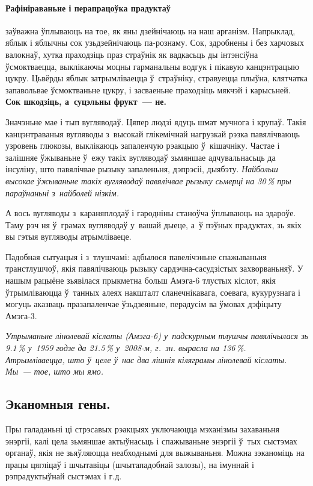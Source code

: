 \paragraph{Рафініраваньне і перапрацоўка прадуктаў} заўважна ўплываюць на тое, як яны дзейнічаюць на наш арганізм. Напрыклад, яблык і яблычны сок узьдзейнічаюць па-рознаму. Сок, здробнены і без харчовых валокнаў, хутка праходзіць праз страўнік як вадкасьць ды інтэнсіўна ўсмоктваецца, выклікаючы моцны гарманальны водгук і пікавую канцэнтрацыю цукру. Цьвёрды яблык затрымліваецца ў~страўніку, стравуецца плыўна, клятчатка запавольвае ўсмоктваньне цукру, і засваеньне праходзіць мякчэй і карысьней. \textbf{Сок шкодзіць, а~суцэльны фрукт~--- не.}

Значэньне мае і тып вугляводаў. Цяпер людзі ядуць шмат мучнога і крупаў. Такія канцэнтраваныя вугляводы з~высокай глікемічнай нагрузкай рэзка павялічваюць узровень глюкозы, выклікаюць запаленчую рэакцыю ў~кішачніку. Частае і залішняе ўжываньне ў~ежу такіх вугляводаў зьмяншае адчувальнасьць да інсуліну, што павялічвае рызыку запаленьня, дэпрэсіі, дыябэту. \emph{Найбольш высокае ўжываньне такіх вугляводаў павялічвае рызыку сьмерці на 30\,\% пры параўнаньні з~найболей нізкім.}

А вось вугляводы з~караняплодаў і гародніны станоўча ўплываюць на здароўе. Таму рэч ня ў~грамах вугляводаў у~вашай дыеце, а~ў пэўных прадуктах, зь якіх вы гэтыя вугляводы атрымліваеце.

Падобная сытуацыя і з~тлушчамі: адбылося павелічэньне спажываньня транстлушчоў, якія павялічваюць рызыку сардэчна-сасудзістых захворваньняў. У нашым рацыёне зьявілася прыкметна больш Амэга-6 тлустых кіслот, якія ўтрымліваюцца ў~танных алеях накшталт сланечнікавага, соевага, кукурузнага і могуць аказваць празапаленчае ўзьдзеяньне, перадусім ва ўмовах дэфіцыту Амэга-3. 

\emph{Утрыманьне лінолевай кіслаты (Амэга-6) у~падскурным тлушчы павялічылася зь 9.1\,\% у~1959 годзе да 21.5\,\% у~2008-м, г.~зн. вырасла на 136\,\%. Атрымліваецца, што ў~целе ў~нас два лішнія кіляграмы лінолевай кіслаты. Мы~--- тое, што мы ямо.}

\subsection*{Эканомныя гены.}

Пры галаданьні ці стрэсавых рэакцыях уключаюцца мэханізмы захаваньня энэргіі, калі цела зьмяншае актыўнасьць і спажываньне энэргіі ў~тых сыстэмах органаў, якія не зьяўляюцца неабходнымі для выжываньня. Можна зэканоміць на працы цягліцаў і шчытавіцы (шчытападобнай залозы), на імуннай і рэпрадуктыўнай сыстэмах і г.д.

